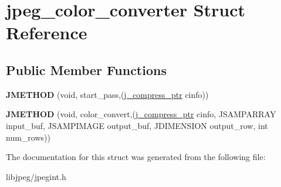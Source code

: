 \hypertarget{structjpeg__color__converter}{\section{jpeg\-\_\-color\-\_\-converter Struct Reference}
\label{structjpeg__color__converter}
}
\subsection*{Public Member Functions}
\begin{DoxyCompactItemize}
\item 
\hypertarget{structjpeg__color__converter_a1c9f24e568c3d4f67cb2021066825997}{{\bfseries J\-M\-E\-T\-H\-O\-D} (void, start\-\_\-pass,(\hyperlink{structjpeg__compress__struct}{j\-\_\-compress\-\_\-ptr} cinfo))}\label{structjpeg__color__converter_a1c9f24e568c3d4f67cb2021066825997}

\item 
\hypertarget{structjpeg__color__converter_aed90a059ad823add4785973694ed5eb9}{{\bfseries J\-M\-E\-T\-H\-O\-D} (void, color\-\_\-convert,(\hyperlink{structjpeg__compress__struct}{j\-\_\-compress\-\_\-ptr} cinfo, J\-S\-A\-M\-P\-A\-R\-R\-A\-Y input\-\_\-buf, J\-S\-A\-M\-P\-I\-M\-A\-G\-E output\-\_\-buf, J\-D\-I\-M\-E\-N\-S\-I\-O\-N output\-\_\-row, int num\-\_\-rows))}\label{structjpeg__color__converter_aed90a059ad823add4785973694ed5eb9}

\end{DoxyCompactItemize}


The documentation for this struct was generated from the following file\-:\begin{DoxyCompactItemize}
\item 
libjpeg/jpegint.\-h\end{DoxyCompactItemize}
